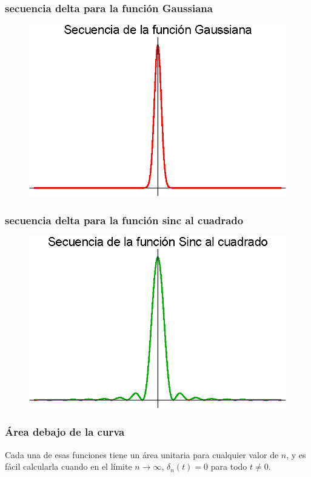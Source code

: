 \documentclass[12pt]{beamer}
\begin{document}
\begin{frame}
\frametitle{secuencia delta para la función Gaussiana}
\begin{figure}[H]
    \centering
    \includegraphics[scale=1]{Imagenes/secuencia_Delta_06.eps}
\end{figure}
\end{frame}
\begin{frame}
\frametitle{secuencia delta para la función sinc al cuadrado}
\begin{figure}[H]
    \centering
    \includegraphics[scale=1]{Imagenes/secuencia_Delta_07.eps}
\end{figure}
\end{frame}
\begin{frame}
\frametitle{Área debajo de la curva}
Cada una de esas funciones tiene un área unitaria para cualquier valor de $n$, y es fácil calcularla cuando en el límite $n \to \infty$, $\delta_{n} (t) = 0$ para todo $t \neq 0$.
\end{frame}
\end{document}
